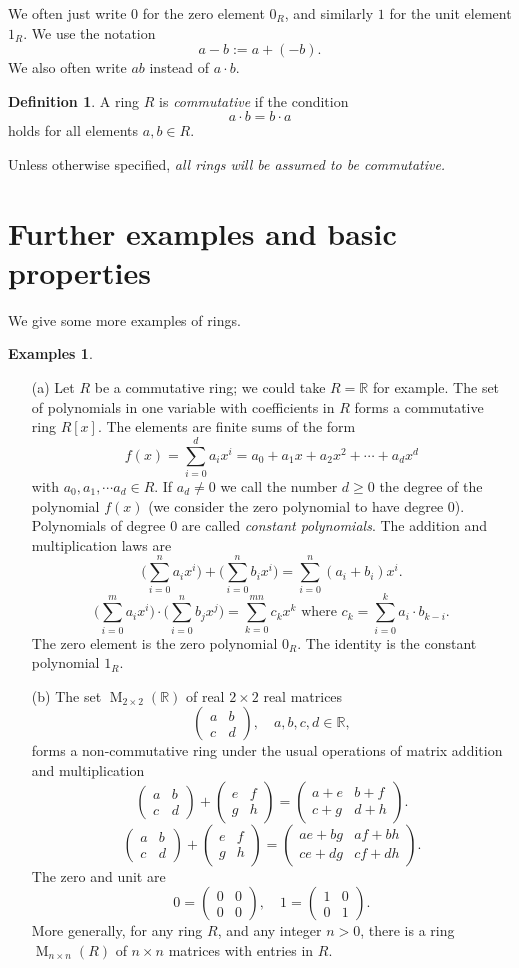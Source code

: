 \documentclass [12pt,oneside,a4paper,mathscr]{amsart}
\theoremstyle{definition}
\newtheorem{defn}[thm]{Definition}
\newtheorem{examples}[thm]{Examples}
\renewcommand{\geq}{\geqslant}
\newcommand{\R}{\mathbb{R}}
\newcommand{\M}{\operatorname{M}}
\newcommand{\mat}[4]{\left( \begin{array}{cc} #1 & #2 \\ #3 & #4
\end{array} \right)}
\begin{document}
We often just write $0$ for the zero element $0_R$, and similarly $1$ for the unit element $1_R$. We use the notation  \[a-b:=a+(-b).\] We  also often write $ab$ instead of $a\cdot b$. 

\begin{defn}
A ring $R$ is \emph{commutative} if the condition  \[a\cdot b = b\cdot a\] holds for all elements $a,b\in R$.
\end{defn}


Unless otherwise specified, \emph{all rings  will be assumed to be commutative.}



\section{Further examples and basic properties}

We give some more examples of rings.




\begin{examples}
\label{begin}
\begin{itemize}
\item[(a)] Let $R$ be a commutative ring; we could take  $R=\R$ for example. The set of  polynomials in one variable with coefficients in $R$ forms a commutative ring $R[x]$. The elements are finite sums of the form
\[f(x)=\sum_{i=0}^d a_i x^i = a_0 + a_1 x + a_2 x^2 + \cdots + a_d x^d\]
with $a_0,a_1,\cdots a_d\in R$. If $a_d\neq 0$ we call the number $d\geq 0$ the degree of the polynomial $f(x)$ (we consider the zero polynomial to have degree 0).
Polynomials of degree 0 are called \emph{constant polynomials}. The addition and multiplication laws are
\[\big(\sum_{i=0}^n a_i x^i\big) + \big(\sum_{i=0}^n b_i x^i\big)  = \sum_{i=0}^n (a_i + b_i) x^i.\]
\[\big(\sum_{i=0}^m a_i x^i\big) \cdot \big(\sum_{i=0}^n b_j x^j\big)  = \sum_{k=0}^{mn} c_k x^k \text{ where } c_k = \sum_{i=0}^k a_i \cdot b_{k-i}.\]
The zero element is the zero polynomial $0_R$. The identity is the constant polynomial $1_R$.

\smallskip
\item[(b)] The set $\M_{2\times 2}(\R)$ of real $2\times 2$ real matrices \[\mat{a}{b}{c}{d}, \quad a,b,c,d\in \R,\]
forms a non-commutative ring under the usual operations of matrix addition and multiplication\[\mat{a}{b}{c}{d} + \mat{e}{f}{g}{h} = \mat{a+e}{b+f}{c+g}{d+h}.\]
\[ \mat{a}{b}{c}{d} + \mat{e}{f}{g}{h} = \mat{ae+bg}{af+bh}{ce+dg}{cf+dh}.\]
The zero and unit are
\[0=\mat{0}{0}{0}{0}, \quad 1=\mat{1}{0}{0}{1}.\]
More generally, for any ring $R$, and any integer $n>0$,  there is a ring $\M_{n\times n}(R)$ of $n\times n$ matrices with entries in $R$.
\end{itemize}
\end{examples}
\end{document}
